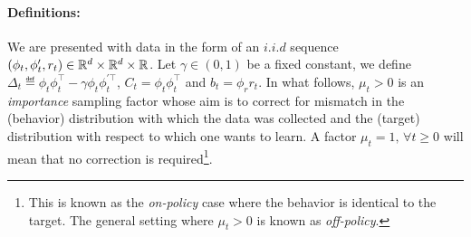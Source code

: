 \paragraph{Definitions:} We are presented with data in the form of an $i.i.d$ sequence $(\phi_t,\phi'_t,r_t)\in \mathbb{R}^d\times\mathbb{R}^d\times \mathbb{R}$. Let $\gamma \in (0,1)$ be a fixed constant, we define $\Delta_t\eqdef \phi_t\phi_t^\top-\gamma \phi_t\phi_t^{'\top}$, $C_t=\phi_t\phi_t^\top$ and $b_t=\phi_r r_t$. In what follows, $\mu_t>0$ is an \emph{importance} sampling factor whose aim is to correct for mismatch in the (behavior) distribution with which the data was collected and the (target) distribution with respect to which one wants to learn. A factor $\mu_t=1,\,\forall t\geq 0$ will mean that no correction is required\footnote{This is known as the \emph{on-policy} case where the behavior is identical to the target. The general setting where $\mu_t>0$ is known as \emph{off-policy}.}.
